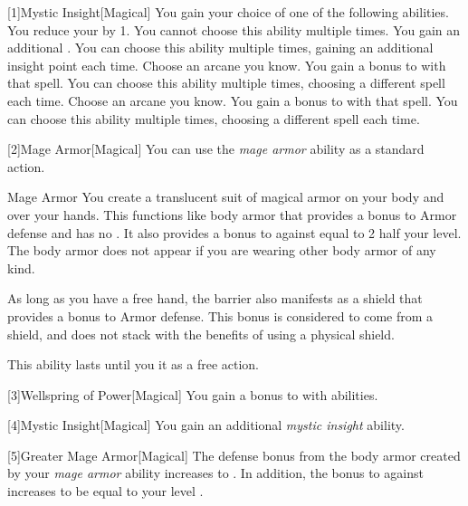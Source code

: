         [1]{Mystic Insight}[Magical]
        You gain your choice of one of the following abilities.
        {
             You reduce your  by 1.
                You cannot choose this ability multiple times.
             You gain an additional .
                You can choose this ability multiple times, gaining an additional insight point each time.
             Choose an arcane  you know.
                You gain a  bonus to  with that spell.
                You can choose this ability multiple times, choosing a different spell each time.
             Choose an arcane  you know.
                You gain a  bonus to  with that spell.
                You can choose this ability multiple times, choosing a different spell each time.
        }

        [2]{Mage Armor}[Magical] You can use the \textit{mage armor} ability as a standard action.
        \begin{freeability}{Mage Armor}
            You create a translucent suit of magical armor on your body and over your hands.
            This functions like body armor that provides a  bonus to Armor defense and has no .
            It also provides a bonus to  against  equal to 2 \add half your level.
            The body armor does not appear if you are wearing other body armor of any kind.

            As long as you have a free hand, the barrier also manifests as a shield that provides a  bonus to Armor defense.
            This bonus is considered to come from a shield, and does not stack with the benefits of using a physical shield.

            This ability lasts until you  it as a free action.
        \end{freeability}

        [3]{Wellspring of Power}[Magical]
        You gain a  bonus to  with  abilities.

        [4]{Mystic Insight}[Magical]
        You gain an additional \textit{mystic insight} ability.

        [5]{Greater Mage Armor}[Magical]
        The defense bonus from the body armor created by your \textit{mage armor} ability increases to .
        In addition, the bonus to  against  increases to be equal to your level .

